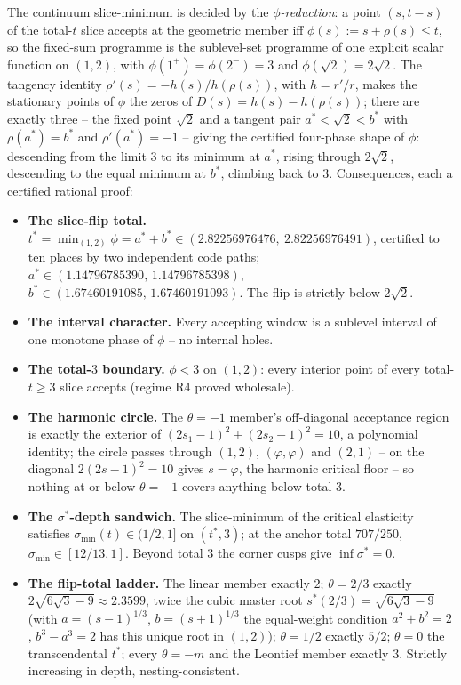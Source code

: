 The continuum slice-minimum is decided by the \emph{$\phi$-reduction}: a point $(s,t-s)$ of the total-$t$ slice accepts at the geometric member iff $\phi(s):=s+\rho(s)\le t$, so the fixed-sum programme is the sublevel-set programme of one explicit scalar function on $(1,2)$, with $\phi(1^+)=\phi(2^-)=3$ and $\phi(\sqrt2)=2\sqrt2$. The tangency identity $\rho'(s)=-h(s)/h(\rho(s))$, with $h=r'/r$, makes the stationary points of $\phi$ the zeros of $D(s)=h(s)-h(\rho(s))$; there are exactly three -- the fixed point $\sqrt2$ and a tangent pair $a^*<\sqrt2<b^*$ with $\rho(a^*)=b^*$ and $\rho'(a^*)=-1$ -- giving the certified four-phase shape of $\phi$: descending from the limit $3$ to its minimum at $a^*$, rising through $2\sqrt2$, descending to the equal minimum at $b^*$, climbing back to $3$. Consequences, each a certified rational proof:
\begin{itemize}[leftmargin=2em]
\item \textbf{The slice-flip total.} $t^*=\min_{(1,2)}\phi=a^*+b^*\in(2.82256976476,\ 2.82256976491)$, certified to ten places by two independent code paths; $a^*\in(1.14796785390,\,1.14796785398)$, $b^*\in(1.67460191085,\,1.67460191093)$. The flip is strictly below $2\sqrt2$.
\item \textbf{The interval character.} Every accepting window is a sublevel interval of one monotone phase of $\phi$ -- no internal holes.
\item \textbf{The total-$3$ boundary.} $\phi<3$ on $(1,2)$: every interior point of every total-$t\ge3$ slice accepts (regime R4 proved wholesale).
\item \textbf{The harmonic circle.} The $\theta=-1$ member's off-diagonal acceptance region is exactly the exterior of $(2s_1-1)^2+(2s_2-1)^2=10$, a polynomial identity; the circle passes through $(1,2)$, $(\varphi,\varphi)$ and $(2,1)$ -- on the diagonal $2(2s-1)^2=10$ gives $s=\varphi$, the harmonic critical floor -- so nothing at or below $\theta=-1$ covers anything below total $3$.
\item \textbf{The $\sigma^*$-depth sandwich.} The slice-minimum of the critical elasticity satisfies $\sigma_{\min}(t)\in(1/2,1]$ on $(t^*,3)$; at the anchor total $707/250$, $\sigma_{\min}\in[12/13,1]$. Beyond total $3$ the corner cusps give $\inf\sigma^*=0$.
\item \textbf{The flip-total ladder.} The linear member exactly $2$; $\theta=2/3$ exactly $2\sqrt{6\sqrt3-9}\approx2.3599$, twice the cubic master root $s^*(2/3)=\sqrt{6\sqrt3-9}$ (with $a=(s-1)^{1/3}$, $b=(s+1)^{1/3}$ the equal-weight condition $a^2+b^2=2$, $b^3-a^3=2$ has this unique root in $(1,2)$); $\theta=1/2$ exactly $5/2$; $\theta=0$ the transcendental $t^*$; every $\theta=-m$ and the Leontief member exactly $3$. Strictly increasing in depth, nesting-consistent.
\end{itemize}

